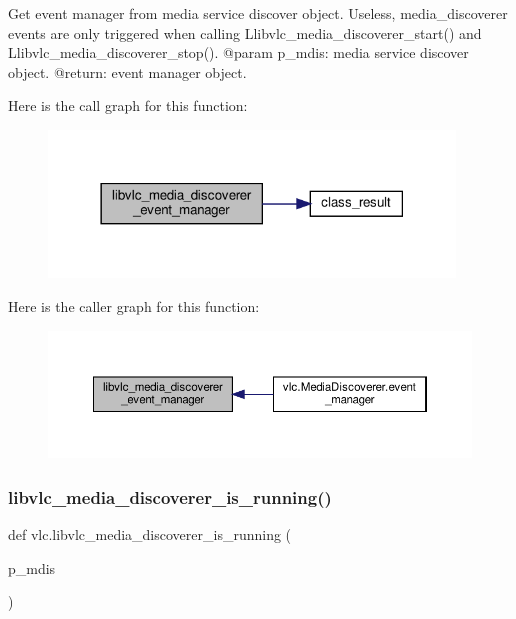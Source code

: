 \begin{DoxyVerb}Get event manager from media service discover object.
\deprecated Useless, media_discoverer events are only triggered when calling
L{libvlc_media_discoverer_start}() and L{libvlc_media_discoverer_stop}().
@param p_mdis: media service discover object.
@return: event manager object.
\end{DoxyVerb}
 Here is the call graph for this function\+:
\nopagebreak
\begin{figure}[H]
\begin{center}
\leavevmode
\includegraphics[width=306pt]{namespacevlc_ae17b8e9a27594920a38298179a0198e6_cgraph}
\end{center}
\end{figure}
Here is the caller graph for this function\+:
\nopagebreak
\begin{figure}[H]
\begin{center}
\leavevmode
\includegraphics[width=350pt]{namespacevlc_ae17b8e9a27594920a38298179a0198e6_icgraph}
\end{center}
\end{figure}
\mbox{\label{namespacevlc_a67f645168455fbbbb9199ff602583113}} 
\subsubsection{\texorpdfstring{libvlc\+\_\+media\+\_\+discoverer\+\_\+is\+\_\+running()}{libvlc\_media\_discoverer\_is\_running()}}
{\footnotesize\ttfamily def vlc.\+libvlc\+\_\+media\+\_\+discoverer\+\_\+is\+\_\+running (\begin{DoxyParamCaption}\item[{}]{p\+\_\+mdis }\end{DoxyParamCaption})}

